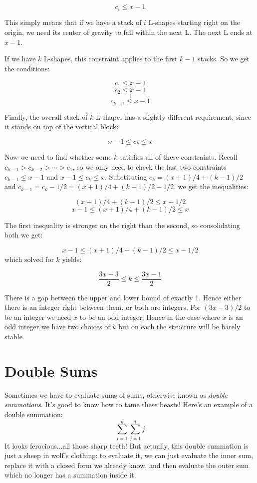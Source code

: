 \documentclass[12pt]{article}
\begin{document}
{$$c_i \leq x - 1$$

This simply means that if we have a stack of $i$ L-shapes starting right on the origin, we need its center of gravity to fall within the next L. The next L ends at $x-1$.

If we have $k$ L-shapes, this constraint applies to the first $k-1$ stacks. So we get the conditions:

$$c_1 \leq x-1$$
$$c_2 \leq x-1$$
$$\vdots$$
$$c_{k-1} \leq x-1$$

Finally, the overall stack of $k$ L-shapes has a slightly different requirement, since it stands on top of the vertical block:

$$x - 1 \leq  c_{k} \leq x$$

Now we need to find whether some $k$ satisfies all of these constraints. Recall $c_{k-1} > c_{k-2} > \cdots > c_{1}$, so we only need to check the last two constraints $c_{k-1} \leq x -1$ and $x - 1 \leq  c_{k} \leq x$. Substituting $c_k = (x+1)/4  + (k - 1)/2$ and $c_{k-1} = c_{k} - 1/2 = (x + 1)/4 + (k-1)/2 - 1/2$, we get the inequalities:

$$(x + 1)/4 + (k-1)/2 \leq  x - 1/2$$
$$ x - 1 \leq (x+1)/4 + (k-1)/2 \leq x$$

The first inequality is stronger on the right than the second, so consolidating both we get:

$$ x - 1 \leq  (x+1)/4 + (k-1)/2 \leq x - 1/2$$ which solved for $k$ yields:

$$\dfrac{3x - 3}{2} \leq k \leq \dfrac{3x- 1}{2}$$

There is a gap between the upper and lower bound of exactly 1. Hence either there is an integer right between them, or both are integers. For $(3x-3)/2$ to be an integer we need $x$ to be an odd integer.  Hence in the case where $x$ is an odd integer we have two choices of $k$ but on each the structure will be barely stable.

}
\newpage

\section{Double Sums}

Sometimes we have to evaluate sums of sums, otherwise known as
\emph{double summations}. It's good to know how to tame these beasts!
Here's an example of a double summation:
\[
\sum_{i=1}^n \sum_{j=1}^i j
\]
It looks ferocious...all those sharp teeth! But actually, this double
summation is just a sheep in wolf's clothing: to evaluate it, we can
just evaluate the inner sum, replace it with a closed form we already
know, and then evaluate the outer sum which no longer has a summation
inside it.
\end{document}
